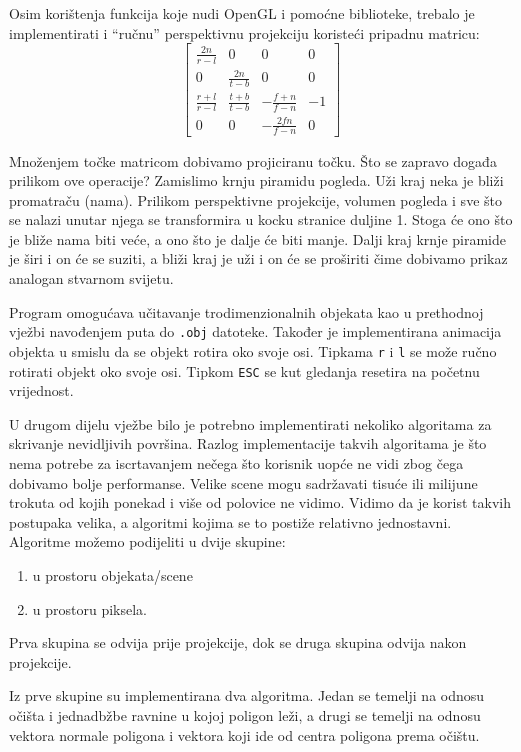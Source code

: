 \documentclass[a4paper,12pt]{article}
\begin{document}
Osim korištenja funkcija koje nudi OpenGL i pomoćne biblioteke, trebalo je implementirati i
``ručnu'' perspektivnu projekciju koristeći pripadnu matricu:
\[
\begin{bmatrix}
  \frac{2n}{r - l} & 0 & 0 & 0\\
  0 & \frac{2n}{t - b} &  0 & 0\\
  \frac{r + l}{r - l} & \frac{t + b}{t - b} & -\frac{f + n}{f - n} & -1\\
  0 & 0 & -\frac{2fn}{f - n} & 0
\end{bmatrix}
\]

Množenjem točke matricom dobivamo projiciranu točku. Što se zapravo događa
prilikom ove operacije? Zamislimo krnju piramidu pogleda. Uži kraj neka je
bliži promatraču (nama). Prilikom perspektivne projekcije, volumen pogleda i
sve što se nalazi unutar njega se transformira u kocku stranice duljine 1.
Stoga će ono što je bliže nama biti veće, a ono što je dalje će biti manje.
Dalji kraj krnje piramide je širi i on će se suziti, a bliži kraj je uži i
on će se proširiti čime dobivamo prikaz analogan stvarnom svijetu.

Program omogućava učitavanje trodimenzionalnih objekata kao u prethodnoj
vježbi navođenjem puta do {\verb|.obj|} datoteke. Također je implementirana
animacija objekta u smislu da se objekt rotira oko svoje osi. Tipkama
{\tt r} i {\tt l} se može ručno rotirati objekt oko svoje osi. Tipkom
{\tt ESC} se kut gledanja resetira na početnu vrijednost.

U drugom dijelu vježbe bilo je potrebno implementirati nekoliko algoritama
za skrivanje nevidljivih površina. Razlog implementacije takvih algoritama
je što nema potrebe za iscrtavanjem nečega što korisnik uopće ne vidi zbog
čega dobivamo bolje performanse. Velike scene mogu sadržavati tisuće ili
milijune trokuta od kojih ponekad i više od polovice ne vidimo. Vidimo
da je korist takvih postupaka velika, a algoritmi kojima se to postiže
relativno jednostavni. Algoritme možemo podijeliti u dvije skupine:
\begin{enumerate}
  \item u prostoru objekata/scene
  \item u prostoru piksela.
\end{enumerate}

Prva skupina se odvija prije projekcije, dok se druga skupina odvija nakon
projekcije.

Iz prve skupine su implementirana dva algoritma. Jedan se temelji na odnosu
očišta i jednadbžbe ravnine u kojoj poligon leži, a drugi se temelji na
odnosu vektora normale poligona i vektora koji ide od centra poligona prema
očištu.
\end{document}
